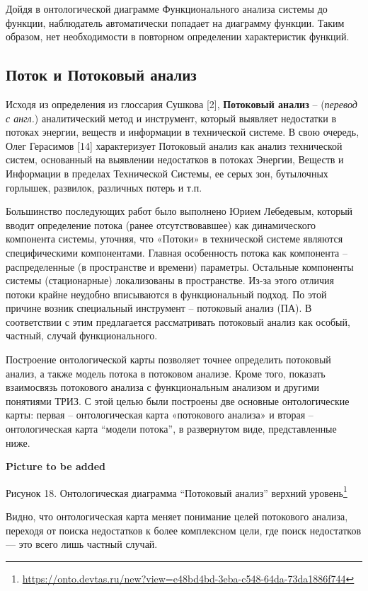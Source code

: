\documentclass[11pt,a4paper]{article}
\newcommand{\addpicture}{\textbf{Picture to be added}\par}
\begin{document}
Дойдя в онтологической диаграмме Функционального анализа системы до функции,
наблюдатель автоматически попадает на диаграмму функции. Таким образом, нет
необходимости в повторном определении характеристик функций.

\subsection{Поток и Потоковый анализ}

Исходя из определения из глоссария Сушкова [2], \textbf{Потоковый анализ} --
(\emph{перевод с англ.}) аналитический метод и инструмент, который выявляет
недостатки в потоках энергии, веществ и информации в технической системе. В
свою очередь, Олег Герасимов [14] характеризует Потоковый анализ как анализ
технической систем, основанный на выявлении недостатков в потоках Энергии,
Веществ и Информации в пределах Технической Системы, ее серых зон, бутылочных
горлышек, развилок, различных потерь и т.п.

Большинство последующих работ было выполнено Юрием Лебедевым, который вводит
определение потока (ранее отсутствовавшее) как динамического компонента
системы, уточняя, что «Потоки» в технической системе являются специфическими
компонентами. Главная особенность потока как компонента – распределенные (в
пространстве и времени) параметры. Остальные компоненты системы (стационарные)
локализованы в пространстве. Из-за этого отличия потоки крайне неудобно
вписываются в функциональный подход. По этой причине возник специальный
инструмент – потоковый анализ (ПА). В соответствии с этим предлагается
рассматривать потоковый анализ как особый, частный, случай функционального.

Построение онтологической карты позволяет точнее определить потоковый анализ,
а также модель потока в потоковом анализе. Кроме того, показать взаимосвязь
потокового анализа с функциональным анализом и другими понятиями ТРИЗ. С этой
целью были построены две основные онтологические карты: первая --
онтологическая карта «потокового анализа» и вторая -- онтологическая карта
“модели потока”, в развернутом виде, представленные ниже.
\begin{center}
  \addpicture
  Рисунок 18. Онтологическая диаграмма “Потоковый анализ” верхний
  уровень\footnote{\url{https://onto.devtas.ru/new?view=e48bd4bd-3eba-c548-64da-73da1886f744}} 
\end{center}
Видно,
что онтологическая карта меняет понимание целей потокового анализа, переходя
от поиска недостатков к более комплексном цели, где поиск недостатков — это
всего лишь частный случай.
\end{document}
